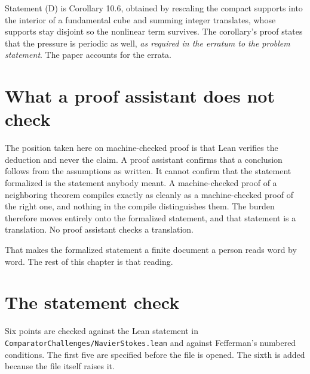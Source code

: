 Statement (D) is Corollary 10.6, obtained by rescaling the compact supports into the interior of a
fundamental cube and summing integer translates, whose supports stay disjoint so the nonlinear term
survives. The corollary's proof states that the pressure is periodic as well, \emph{as required in
the erratum to the problem statement}. The paper accounts for the errata.

\section{What a proof assistant does not check}

The position taken here on machine-checked proof is that Lean verifies the deduction and never the
claim. A proof assistant confirms that a conclusion follows from the assumptions as written. It
cannot confirm that the statement formalized is the statement anybody meant. A machine-checked proof
of a neighboring theorem compiles exactly as cleanly as a machine-checked proof of the right one, and
nothing in the compile distinguishes them. The burden therefore moves entirely onto the formalized
statement, and that statement is a translation. No proof assistant checks a translation.

That makes the formalized statement a finite document a person reads word by word. The rest of this
chapter is that reading.

\section{The statement check}

Six points are checked against the Lean statement in
\texttt{ComparatorChallenges/\allowbreak{}NavierStokes.\allowbreak{}lean} and against Fefferman's
numbered conditions. The first five are specified before the file is opened. The sixth is added
because the file itself raises it.

